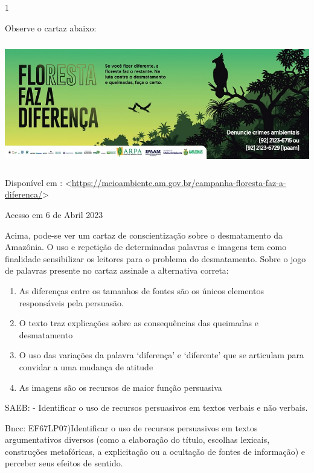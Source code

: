{{\begin{itemize}
\begin{itemize}
\num{1}

Observe o cartaz abaixo:

\includegraphics[width=5.90551in,height=2.125in]{./imgSAEB_7_POR/media/image16.png}

Disponível em :
\textless{}\href{https://meioambiente.am.gov.br/campanha-floresta-faz-a-diferenca/}{\uline{https://meioambiente.am.gov.br/campanha-floresta-faz-a-diferenca/}}\textgreater{}

Acesso em 6 de Abril 2023

Acima, pode-se ver um cartaz de conscientização sobre o desmatamento da
Amazônia. O uso e repetição de determinadas palavras e imagens tem como
finalidade sensibilizar os leitores para o problema do desmatamento.
Sobre o jogo de palavras presente no cartaz assinale a alternativa
correta:

\begin{enumerate}
\def\labelenumi{\alph{enumi})}
\item
  As diferenças entre os tamanhos de fontes são os únicos elementos
  responsáveis pela persuasão.
\item
  O texto traz explicações sobre as consequências das queimadas e
  desmatamento
\item
  O uso das variações da palavra `diferença' e `diferente' que se
  articulam para convidar a uma mudança de atitude
\item
  As imagens são os recursos de maior função persuasiva
\end{enumerate}

SAEB: - Identificar o uso de recursos persuasivos em textos verbais e
não verbais.

Bncc: EF67LP07)Identificar o uso de recursos persuasivos em textos
argumentativos diversos (como a elaboração do título, escolhas lexicais,
construções metafóricas, a explicitação ou a ocultação de fontes de
informação) e perceber seus efeitos de sentido.


\end{itemize}
\end{itemize}}}
